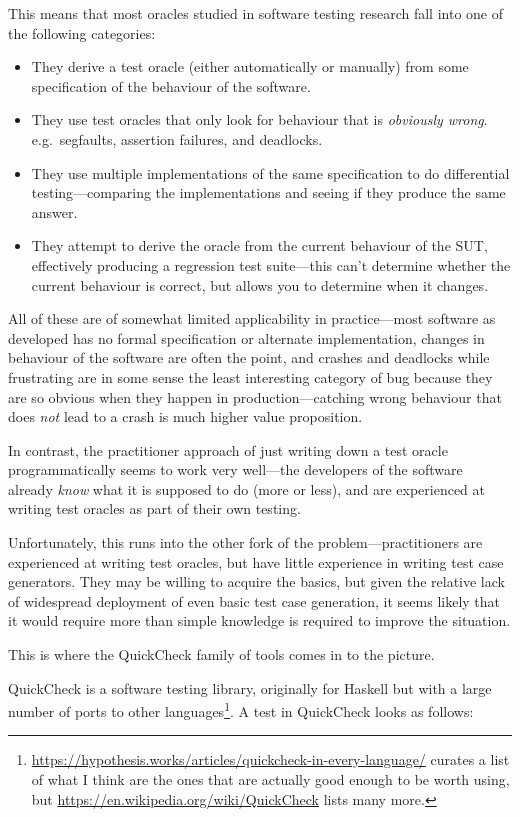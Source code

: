 This means that most oracles studied in software testing research fall into one of the following categories:

\begin{itemize}
\item They derive a test oracle (either automatically or manually) from some specification of the behaviour of the software.
\item They use test oracles that only look for behaviour that is \emph{obviously wrong}.
e.g.\ segfaults, assertion failures, and deadlocks.
\item They use multiple implementations of the same specification to do differential testing---comparing
the implementations and seeing if they produce the same answer.
\item They attempt to derive the oracle from the current behaviour of the SUT,
effectively producing a regression test suite---this
can't determine whether the current behaviour is correct,
but allows you to determine when it changes.
\end{itemize}

All of these are of somewhat limited applicability in practice---most
software as developed has no formal specification or alternate implementation,
changes in behaviour of the software are often the point,
and crashes and deadlocks while frustrating are in some sense the least interesting category of bug because they are so obvious when they happen in production---catching
wrong behaviour that does \emph{not} lead to a crash is much higher value proposition.

In contrast,
the practitioner approach of just writing down a test oracle programmatically seems to work very well---the
developers of the software already \emph{know} what it is supposed to do (more or less),
and are experienced at writing test oracles as part of their own testing.

Unfortunately,
this runs into the other fork of the problem---practitioners
are experienced at writing test oracles,
but have little experience in writing test case generators.
They may be willing to acquire the basics,
but given the relative lack of widespread deployment of even basic test case generation,
it seems likely that it would require more than simple knowledge is required to improve the situation.

This is where the QuickCheck\cite{DBLP:conf/icfp/ClaessenH00} family of tools comes in to the picture.

QuickCheck is a software testing library,
originally for Haskell but with a large number of ports to other languages\footnote{
\url{https://hypothesis.works/articles/quickcheck-in-every-language/} curates a list of what I think are the ones that are actually good enough to be worth using,
but \url{https://en.wikipedia.org/wiki/QuickCheck} lists many more.
}.
A test in QuickCheck looks as follows:


